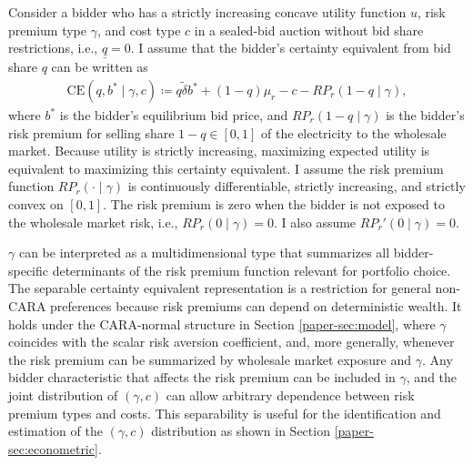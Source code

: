 \documentclass[12pt]{article}
\theoremstyle{definition} %
\begin{document}
Consider a bidder who has a strictly increasing concave utility function $u$, risk premium type $\gamma$, and cost type $c$ in a sealed-bid auction without bid share restrictions, i.e., $\underline{q} = 0$. I assume that the bidder's certainty equivalent from bid share $q$ can be written as
\begin{align*}
\mathrm{CE}(q,b^\ast\mid\gamma,c)
\coloneqq q \tilde{\delta} b^\ast + (1-q)\mu_r - c - RP_r(1-q \mid \gamma),
\end{align*}
where $b^\ast$ is the bidder's equilibrium bid price, and $RP_r(1-q \mid \gamma)$ is the bidder's risk premium for selling share $1 - q \in [0,1]$ of the electricity to the wholesale market. Because utility is strictly increasing, maximizing expected utility is equivalent to maximizing this certainty equivalent. I assume the risk premium function $RP_r(\cdot \mid \gamma)$ is continuously differentiable, strictly increasing, and strictly convex on $[0,1]$. The risk premium is zero when the bidder is not exposed to the wholesale market risk, i.e., $RP_r(0 \mid \gamma) = 0 $. I also assume $RP_r'(0 \mid \gamma) = 0 $.

$\gamma$ can be interpreted as a multidimensional type that summarizes all bidder-specific determinants of the risk premium function relevant for portfolio choice. The separable certainty equivalent representation is a restriction for general non-CARA preferences because risk premiums can depend on deterministic wealth. It holds under the CARA-normal structure in Section \ref{paper-sec:model}, where $\gamma$ coincides with the scalar risk aversion coefficient, and, more generally, whenever the risk premium can be summarized by wholesale market exposure and $\gamma$. Any bidder characteristic that affects the risk premium can be included in $\gamma$, and the joint distribution of $(\gamma,c)$ can allow arbitrary dependence between risk premium types and costs. This separability is useful for the identification and estimation of the $(\gamma,c)$ distribution as shown in Section \ref{paper-sec:econometric}.
\end{document}
